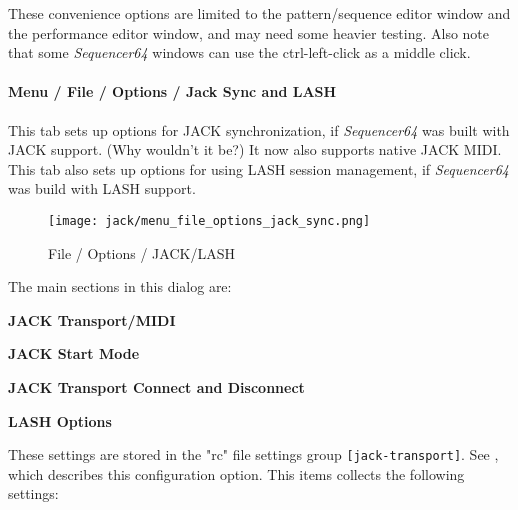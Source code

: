    These convenience options are limited to the
   pattern/sequence editor window and the performance editor window, and may
   need some heavier testing.  Also note that some \textsl{Sequencer64} windows
   can use the ctrl-left-click as a middle click. 
 
\paragraph{Menu / File / Options / Jack Sync and LASH}
\label{paragraph:seq64_menu_file_options_jack_sync}

   This tab sets up options for JACK synchronization, if \textsl{Sequencer64}
   was built with JACK support.  (Why wouldn't it be?)
   It now also supports native JACK MIDI.
   This tab also sets up options for using LASH session management, if
   \textsl{Sequencer64} was build with LASH support.

\begin{figure}[H]
   \centering 
   \texttt{[image: jack/menu\_file\_options\_jack\_sync.png]}
   \caption{File / Options / JACK/LASH}
   \label{fig:seq64_menu_file_options_jack_sync}
\end{figure}

   The main sections in this dialog are:

   \begin{enumber}
      \item \textbf{JACK Transport/MIDI}
      \item \textbf{JACK Start Mode}
      \item \textbf{JACK Transport Connect and Disconnect}
      \item \textbf{LASH Options}
   \end{enumber}

   \setcounter{ItemCounter}{0}      %

   These settings are stored in the "rc" file settings group
   \texttt{[jack-transport]}.
   See ,
   which describes this configuration option.
   This items collects the following settings:

